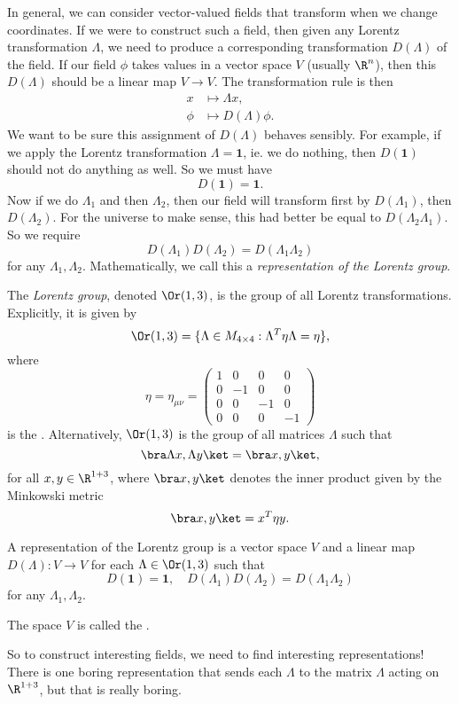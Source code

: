 \documentclass[a4paper]{article}
\begin{document}
In general, we can consider vector-valued fields that transform when we change coordinates. If we were to construct such a field, then given any Lorentz transformation $\Lambda$, we need to produce a corresponding transformation $D(\Lambda)$ of the field. If our field $\phi$ takes values in a vector space $V$ (usually $\R^n$), then this $D(\Lambda)$ should be a linear map $V \to V$. The transformation rule is then
\begin{align*}
  x &\mapsto \Lambda x,\\
  \phi &\mapsto D(\Lambda) \phi.
\end{align*}
We want to be sure this assignment of $D(\Lambda)$ behaves sensibly. For example, if we apply the Lorentz transformation $\Lambda = \mathbf{1}$, ie. we do nothing, then $D(\mathbf{1})$ should not do anything as well. So we must have
\[
  D(\mathbf{1}) = \mathbf{1}.
\]
Now if we do $\Lambda_1$ and then $\Lambda_2$, then our field will transform first by $D(\Lambda_1)$, then $D(\Lambda_2)$. For the universe to make sense, this had better be equal to $D(\Lambda_2 \Lambda_1)$. So we require
\[
  D(\Lambda_1)D(\Lambda_2) = D(\Lambda_1 \Lambda_2)
\]
for any $\Lambda_1, \Lambda_2$. Mathematically, we call this a \emph{representation of the Lorentz group}.
\begin{defi}
  The \emph{Lorentz group}, denoted $\Or(1, 3)$, is the group of all Lorentz transformations. Explicitly, it is given by
  \[
    \Or(1, 3) = \{\Lambda \in M_{4\times 4}: \Lambda^T \eta \Lambda = \eta\},
  \]
  where
  \[
    \eta = \eta_{\mu\nu} =
    \begin{pmatrix}
      1 & 0 & 0 & 0\\
      0 & -1 & 0 & 0\\
      0 & 0 & -1 & 0\\
      0 & 0 & 0 & -1
    \end{pmatrix}
  \]
  is the . Alternatively, $\Or(1, 3)$ is the group of all matrices $\Lambda$ such that
  \[
    \bra \Lambda x, \Lambda y\ket = \bra x, y\ket,
  \]
  for all $x, y \in \R^{1 + 3}$, where $\bra x, y\ket$ denotes the inner product given by the Minkowski metric
  \[
    \bra x, y\ket = x^T \eta y.
  \]
\end{defi}
\begin{defi}
  A representation of the Lorentz group is a vector space $V$ and a linear map $D(\Lambda): V \to V$ for each $\Lambda \in \Or(1, 3)$ such that
  \[
    D(\mathbf{1}) = \mathbf{1}, \quad D(\Lambda_1)D(\Lambda_2) = D(\Lambda_1 \Lambda_2)
  \]
  for any $\Lambda_1, \Lambda_2$.

  The space $V$ is called the .
\end{defi}
So to construct interesting fields, we need to find interesting representations! There is one boring representation that sends each $\Lambda$ to the matrix $\Lambda$ acting on $\R^{1 + 3}$, but that is really boring.
\end{document}
